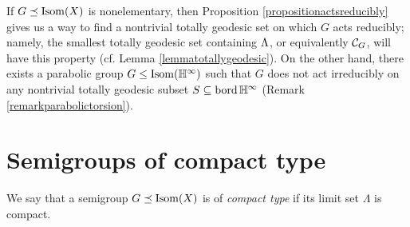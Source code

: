 \begin{remark}
If $G\preceq\operatorname{Isom}(X)$ is nonelementary, then Proposition \ref{propositionactsreducibly} gives us a way to find a nontrivial totally geodesic set on which $G$ acts reducibly; namely, the smallest totally geodesic set containing $\Lambda$, or equivalently $\mathcal C_G$, will have this property (cf. Lemma \ref{lemmatotallygeodesic}). On the other hand, there exists a parabolic group $G\leq\Isom(\H^\infty)$ such that $G$ does not act irreducibly on any nontrivial totally geodesic subset $S\subset\bord \H^\infty$ (Remark \ref{remarkparabolictorsion}).
\end{remark}



\bigskip
\section{Semigroups of compact type}

\begin{definition}
\label{definitioncompacttype}
We say that a semigroup $G\preceq\operatorname{Isom}(X)$ is of \emph{compact type} if its limit set $\Lambda$ is compact.
\end{definition}

